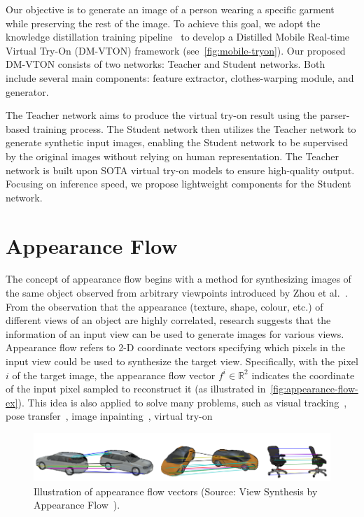 Our objective is to generate an image of a person wearing a specific garment while preserving the rest of the image. To achieve this goal, we adopt the knowledge distillation training pipeline~\cite{Hinton-Arxiv2015-Distilling, Issenhuth-ECCV2020-Do, Ge-CVPR2021-Parser, He-CVPR2022-Style, Lin-IJCAI2022-RMGN} to develop a Distilled Mobile Real-time Virtual Try-On (DM-VTON) framework (see~\autoref{fig:mobile-tryon}). Our proposed DM-VTON consists of two networks: Teacher and Student networks. Both include several main components: feature extractor, clothes-warping module, and generator. 


The Teacher network aims to produce the virtual try-on result using the parser-based training process. The Student network then utilizes the Teacher network to generate synthetic input images, enabling the Student network to be supervised by the original images without relying on human representation. The Teacher network is built upon SOTA virtual try-on models to ensure high-quality output. Focusing on inference speed, we propose lightweight components for the Student network. 

\section{Appearance Flow}
The concept of appearance flow begins with a method for synthesizing images of the same object observed from arbitrary viewpoints introduced by Zhou et al.~\cite{Zhou-ECCV2016-AppearanceFlow}. From the observation that the appearance (texture, shape, colour, etc.) of different views of an object are highly correlated, research suggests that the information of an input view can be used to generate images for various views. Appearance flow refers to 2-D coordinate vectors specifying which pixels in the input view could be used to synthesize the target view. Specifically, with the pixel $i$ of the target image, the appearance flow vector $f^i \in \mathbb{R}^2$ indicates the coordinate of the input pixel sampled to reconstruct it (as illustrated in~\autoref{fig:appearance-flow-ex}). This idea is also applied to solve many problems, such as visual tracking~\cite{Song-ICCV2017-Crest}, pose transfer~\cite{Li-CVPR2019-Dense}, image inpainting~\cite{Liu-ECCV2020-Rethinking}, virtual try-on~\cite{Ge-CVPR2021-Parser, He-CVPR2022-Style}

\begin{figure}[h]
    \centering
    \includegraphics[width=\linewidth]{content/resources/images/tryon/appearance-flow-ex.png}
    \caption{Illustration of appearance flow vectors (Source: View Synthesis by Appearance Flow~\cite{Zhou-ECCV2016-AppearanceFlow}).}
    \label{fig:appearance-flow-ex}
\end{figure}

